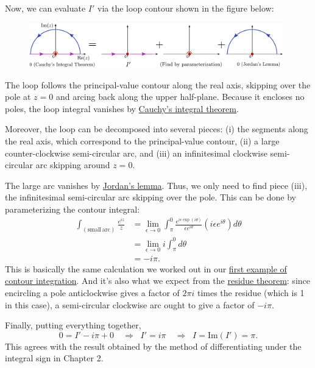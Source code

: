 \documentclass[10pt,a4paper]{article}
\begin{document}
Now, we can evaluate $I'$ via the loop contour shown in the figure
below:

\begin{figure}[h]
  \centering\includegraphics[width=0.98\textwidth]{contour_example4}
\end{figure}

\noindent
The loop follows the principal-value contour along the real axis,
skipping over the pole at $z = 0$ and arcing back along the upper
half-plane. Because it encloses no poles, the loop integral vanishes
by \hyperref[cauchys_theorem]{Cauchy's integral theorem}.

Moreover, the loop can be decomposed into several pieces: (i) the
segments along the real axis, which correspond to the principal-value
contour, (ii) a large counter-clockwise semi-circular arc, and (iii)
an infinitesimal clockwise semi-circular arc skipping around $z = 0$.

The large arc vanishes by \hyperref[jordans_lemma]{Jordan's
  lemma}. Thus, we only need to find piece (iii), the infinitesimal
semi-circular arc skipping over the pole. This can be done by
parameterizing the contour integral:
\begin{align}
  \int_{(\mathrm{small}\,\mathrm{arc})} \frac{e^{iz}}{z}
  &= \lim_{\epsilon \rightarrow 0} \int_{\pi}^{0}
  \frac{e^{i\epsilon \exp(i\theta)}}{\epsilon e^{i\theta}}
  \left(i\epsilon e^{i\theta}\right) d\theta \\
  &= \lim_{\epsilon \rightarrow 0} i \int_{\pi}^0 d\theta \\
  &= - i\pi.
\end{align}
This is basically the same calculation we worked out in our
\hyperref[arc_contour]{first example of contour integration}. And it's
also what we expect from the \hyperref[residue_theorem]{residue
  theorem}: since encircling a pole anticlockwise gives a factor of
$2\pi i$ times the residue (which is 1 in this case), a semi-circular
clockwise arc ought to give a factor of $- i \pi$.

Finally, putting everything together,
\begin{equation}
  0 = I' - i \pi + 0 \quad \Rightarrow \;\; I' = i \pi \quad\Rightarrow \;\; I = \mathrm{Im}(I') = \pi.
\end{equation}
This agrees with the result obtained by the method of differentiating
under the integral sign in Chapter 2.
\end{document}

